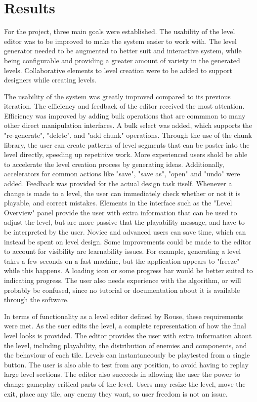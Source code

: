 \chapter{Results}

For the project, three main goals were established. The usability of the level editor was to
be improved to make the system easier to work with. The level generator needed to be
augmented to better suit and interactive system, while being configurable and providing a
greater amount of variety in the generated levels. Collaborative elements to level creation
were to be added to support designers while creating levels.

The usability of the system was greatly improved compared to its previous iteration. The
efficiency and feedback of the editor received the most attention. Efficiency was improved
by adding bulk operations that are commmon to many other direct manipulation interfaces. A
bulk select was added, which supports the "re-generate", "delete", and "add chunk" 
operations. Through the use of the chunk library, the user can create patterns of level 
segments that can be paster into the level directly, speeding up repetitive work. More
experienced users shold be able to accelerate the level creation process by generating
ideas. Additionally, accelerators for common actions like "save", "save as", "open" and
"undo" were added. Feedback was provided for the actual design task itself. Whenever a
change is made to a level, the user can immediately check whether or not it is playable, and
correct mistakes. Elements in the interface such as the "Level Overview" panel provide the 
user with extra information that can be used to adjust the level, but are more passive
that the playability message, and have to be interpreted by the user. Novice and advanced
users can save time, which can instead be spent on level design. Some improvements could
be made to the editor to account for visibility are learnability issues. For example,
generating a level takes a few seconds on a fast machine, but the application appears to
"freeze" while this happens. A loading icon or some progress bar would be better suited to
indicating progress. The user also needs experience with the algorithm, or will probably
be confused, since no tutorial or documentation about it is available through the
software.

In terms of functionality as a level editor defined by Rouse, these requirements were met.
As the suer edits the level, a complete representation of how the final level looks is
provided. The editor provides the user with extra information about the level, including
playability, the distribution of enemies and components, and the behaviour of each tile. 
Levels can instantaneously be playtested from a single button. The user is also able to 
test from any position, to avoid having to replay large level sections. The editor also 
succeeds in allowing the user the power to change gameplay critical parts of the level. 
Users may resize the level, move the exit, place any tile, any enemy they want, so user
freedom is not an issue.

